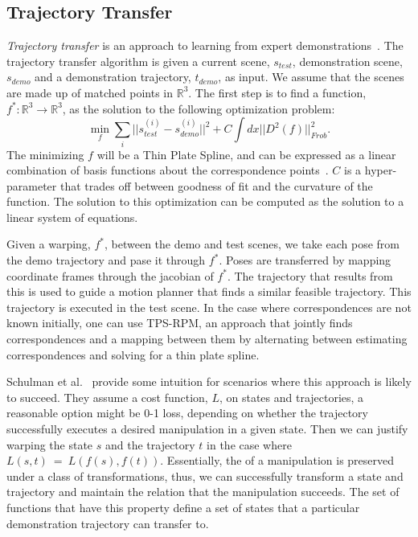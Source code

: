 \subsection{Trajectory Transfer}
\emph{Trajectory transfer} is an approach to learning from expert demonstrations~\cite{Schulmanetal_ISRR2013}. The trajectory transfer
algorithm is given a current scene, $s_{test}$, demonstration scene, $s_{demo}$ and a demonstration trajectory,  
$t_{demo}$, as input. We assume that the scenes are made up of matched points in $\mathbb{R}^3$. The first step is to 
find a function, $f^*:\mathbb{R}^3 \rightarrow \mathbb{R}^3$, as the solution to the following optimization problem:
\begin{equation}\min_f \sum_i ||s_{test}^{(i)} - s_{demo}^{(i)}||^2 + C\int dx ||D^2(f)||^2_{Frob}.\label{eq:tps}\end{equation}
The minimizing $f$ will be a Thin Plate Spline, and can be expressed as a linear combination of basis
functions about the correspondence points~\cite{Wahba_TPS1990}. $C$ is a hyper-parameter that trades off
between goodness of fit and the curvature of the function. The solution to this optimization can be computed
as the solution to a linear system of equations.

Given a warping, $f^*$, between the demo and test scenes, we take each pose from the demo trajectory and pase it through
$f^*$. Poses are transferred by mapping coordinate frames through the jacobian of $f^*$. The trajectory that results from this
is used to guide a motion planner that finds a similar feasible trajectory. This trajectory is executed in the test scene.
In the case where correspondences are not known initially, one can use TPS-RPM, an approach that jointly finds
correspondences and a mapping between them by alternating between estimating correspondences and solving for 
a thin plate spline\cite{Chui_CVIU2003}.

Schulman et al.~\cite{Schulmanetal_ISRR2013} provide some intuition for scenarios where this approach is likely
to succeed. They assume a cost function, $L$, on states and trajectories, a reasonable option might be 0-1 loss, depending
on whether the trajectory successfully executes a desired manipulation in a given state.  Then we can justify warping the
state $s$ and the trajectory $t$ 
in the case where $L(s, t)~=~L(f(s), f(t))$. Essentially, the of a manipulation is preserved under a class of transformations,
thus, we can successfully transform a state and trajectory and maintain the relation that the manipulation succeeds. The set of functions
that have this property define a set of states that a particular demonstration trajectory can transfer to.

